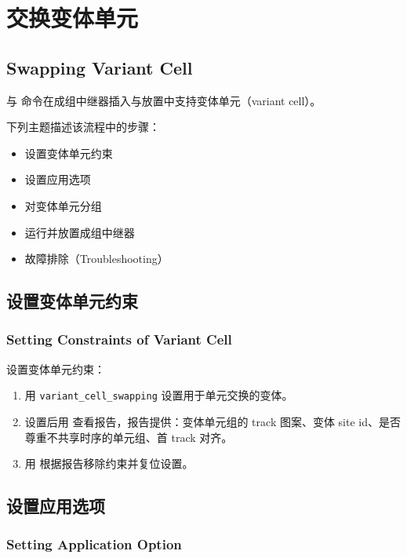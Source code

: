 \section{交换变体单元}
\subsection*{Swapping Variant Cell}

 与  命令在成组中继器插入与放置中支持变体单元（variant cell）。

下列主题描述该流程中的步骤：
\begin{itemize}
  \item 设置变体单元约束
  \item 设置应用选项
  \item 对变体单元分组
  \item 运行并放置成组中继器
  \item 故障排除（Troubleshooting）
\end{itemize}

\subsection{设置变体单元约束}
\subsubsection*{Setting Constraints of Variant Cell}

设置变体单元约束：
\begin{enumerate}
  \item 用   \texttt{variant\_cell\_swapping} 设置用于单元交换的变体。
  \item 设置后用  查看报告，报告提供：变体单元组的 track 图案、变体 site id、是否尊重不共享时序的单元组、首 track 对齐。
  \item 用  根据报告移除约束并复位设置。
\end{enumerate}

\subsection{设置应用选项}
\subsubsection*{Setting Application Option}

